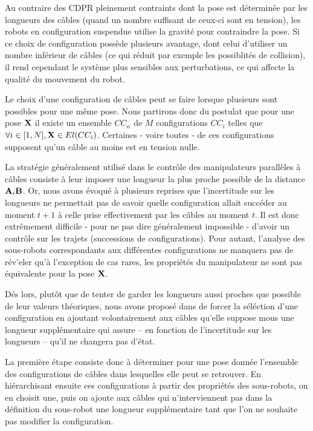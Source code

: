 Au contraire des CDPR pleinement contraints dont la pose est d\'etermin\'ee par 
les longueurs des c\^ables (quand un nombre suffisant de ceux-ci sont en 
tension), les robots en configuration suspendue utilise la gravit\'e pour 
contraindre la pose. Si ce choix de configuration poss\`ede plusieurs avantage, 
dont celui d'utiliser un nombre inf\'erieur de c\^ables (ce qui r\'eduit par 
exemple les possiblit\'es de collision), il rend cependant le syst\`eme plus 
sensibles aux perturbations, ce qui affecte la qualit\'e du mouvement du robot.

Le choix d'une configuration de c\^ables peut se faire lorsque plusieurs sont 
possibles pour une m\^eme pose. Nous partirons donc du postulat que pour une 
pose ${\bf X}$ il existe un ensemble $CC_\alpha$ de $M$ configurations $CC_{i}$ 
telles que $\forall i \in [1, N], {\bf X} \in El(CC_i)$. Certaines - voire 
toutes - de ces configurations supposent qu'un c\^able au moins est en 
tension nulle.

La strat\'egie g\'en\'eralement utilis\'e dans le contr\^ole des manipulateurs 
parall\`eles \`a c\^ables consiste \`a leur imposer une longueur la plus proche 
possible de la distance ${\bf A}_i{\bf B}$. Or, nous avons \'evoqu\'e \`a 
plusieurs reprises que l'incertitude sur les longueurs ne permettait pas de 
savoir quelle configuration allait succ\'eder au moment $t+1$ \`a celle prise 
effectivement par les c\^ables au moment $t$. Il est donc extr\^emement 
difficile - pour ne pas dire g\'en\'eralement impossible - d'avoir un 
contr\^ole sur les trajets (successions de configurations). Pour autant, 
l'analyse des sous-robots correspondants aux diff\'erentes configurations ne 
manquera pas de r\'ev'eler qu'\`a l'exception de cas rares, les propri\'et\'es 
du manipulateur ne sont pas \'equivalente pour la pose ${\bf X}$.

D\'es lors, plut\^ot que de tenter de garder les longueurs aussi proches 
que possible de leur valeurs th\'eoriques, nous avons propos\'e 
dans \cite{ramadour2014} de forcer la s\'el\'ection d'une configuration en 
ajoutant volontairement aux c\^ables qu'elle suppose mous une longueur 
suppl\'ementaire qui assure -- en fonction de l'incertitude sur les longueurs 
-- qu'il ne changera pas d'\'etat.

La premi\`ere \'etape consiste donc \`a d\'eterminer pour une pose donn\'ee 
l'ensemble des configurations de c\^ables dans lesquelles elle peut se 
retrouver. En hi\'erarchisant ensuite ces configurations \`a partir des 
propri\'et\'es des sous-robots, on en choisit une, puis on ajoute aux 
c\^ables qui n'interviennent pas dans la d\'efinition du sous-robot une 
longueur suppl\'ementaire tant que l'on ne souhaite pas modifier la 
configuration.

